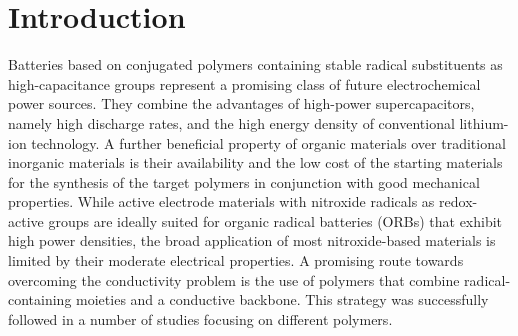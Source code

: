 \documentclass{WileyMSP-template}
\begin{document}


\section{Introduction}
Batteries based on conjugated polymers containing stable radical substituents as high-capacitance groups represent a promising class of future electrochemical power sources.\cite{nakahara2002_cpl, nishide2004_electact,xie2021_mathoriz} They combine the advantages of high-power supercapacitors, namely high discharge rates, and the high energy density of conventional lithium-ion technology. A further beneficial property of organic materials over traditional inorganic materials is their availability and the low cost of the starting materials for the synthesis of the target polymers in conjunction with good mechanical properties.\cite{janoschka2012_advmater, muench2016_chemrev, friebe2017_topcurrchem}
\bigbreak
While active electrode materials with nitroxide radicals as redox-active groups are ideally suited for organic radical batteries (ORBs) that exhibit high power densities, the broad application of most nitroxide-based materials is limited by their moderate electrical properties. A promising route towards overcoming the conductivity problem is the use of polymers that combine radical-containing moieties and a conductive backbone. This strategy was successfully followed in a number of studies focusing on different polymers.\cite{oyaizu2015_polymerjournal, bahaceci2013_jpowersources, katsumata2006_mrc, xu2014_electact, aydin2015_jsoistatelect, schwartz2018_synthmet} 
\bigbreak
\end{document}
